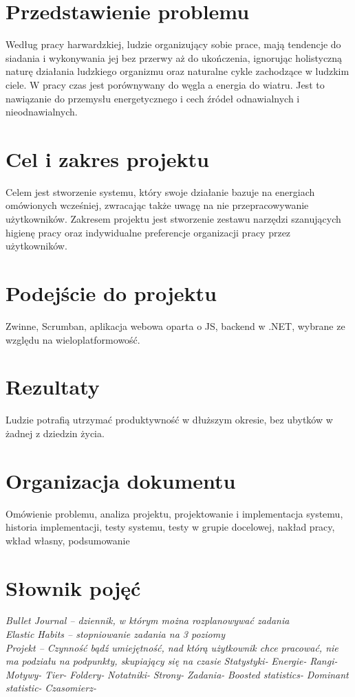 \documentclass[a4paper,11pt]{report}
\begin{document}
\section{Przedstawienie problemu}
Według pracy harwardzkiej, ludzie organizujący sobie prace, mają tendencje do siadania i wykonywania jej bez przerwy aż do ukończenia,
 ignorując holistyczną naturę działania ludzkiego organizmu oraz naturalne cykle zachodzące w ludzkim ciele.
 W pracy czas jest porównywany do węgla a energia do wiatru.
 Jest to nawiązanie do przemysłu energetycznego i cech źródeł odnawialnych i nieodnawialnych.

\section{Cel i zakres projektu}
Celem jest stworzenie systemu, który swoje działanie bazuje na energiach omówionych wcześniej,
 zwracając także uwagę na nie przepracowywanie użytkowników.
\vspace{0,5cm}
Zakresem projektu jest stworzenie zestawu narzędzi szanujących higienę pracy
 oraz indywidualne preferencje organizacji pracy przez użytkowników.

\section{Podejście do projektu}
Zwinne, Scrumban, aplikacja webowa oparta o JS, backend w .NET, wybrane ze względu na wieloplatformowość.

\section{Rezultaty}
Ludzie potrafią utrzymać produktywność w dłuższym okresie, bez ubytków w żadnej z dziedzin życia.

\section{Organizacja dokumentu}
Omówienie problemu, analiza projektu, projektowanie i implementacja systemu, historia implementacji,
 testy systemu, testy w grupie docelowej, nakład pracy, wkład własny, podsumowanie

\section {Słownik pojęć}
	\emph{Bullet Journal – dziennik, w którym można rozplanowywać zadania}\\
	\emph{Elastic Habits – stopniowanie zadania na 3 poziomy}\\
	\emph{Projekt – Czynność bądź umiejętność, nad którą użytkownik chce pracować, nie ma podziału na podpunkty, skupiający się na czasie}
	\emph{Statystyki-}
	\emph{Energie-}
	\emph{Rangi-}
	\emph{Motywy-}
	\emph{Tier-}
	\emph{Foldery-}
	\emph{Notatniki-}
	\emph{Strony-}
	\emph{Zadania-}
	\emph{Boosted statistics-}
	\emph{Dominant statistic-}
	\emph{Czasomierz-}
	
\end{document}
